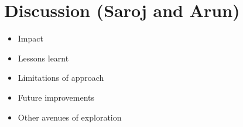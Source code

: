 \section{Discussion (Saroj and Arun)}
\label{sec:discussion}
\begin{itemize}
    \item Impact
    \item Lessons learnt
    \item Limitations of approach
    \item Future improvements
    \item Other avenues of exploration
\end{itemize}